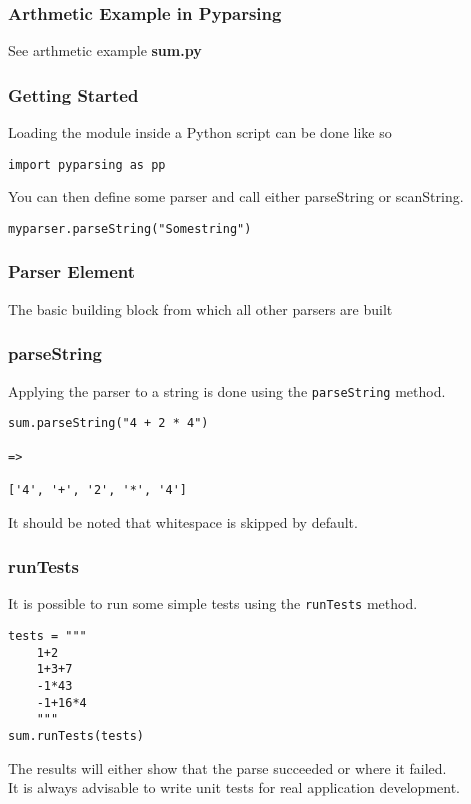 \documentclass{beamer}
\begin{document}
\begin{frame}
\frametitle{Arthmetic Example in Pyparsing}
See arthmetic example \textbf{sum.py}
\end{frame}


\begin{frame}[fragile]
\frametitle{Getting Started}
Loading the module inside a Python script can be done like so
\begin{verbatim}
import pyparsing as pp
\end{verbatim}
\bigskip
You can then define some parser and call either parseString or scanString.
\begin{verbatim}
myparser.parseString("Somestring")
\end{verbatim}
\end{frame}


\begin{frame}
\frametitle{Parser Element}
The basic building block from which all other parsers are built
\begin{center}
\end{center}
\end{frame}



\begin{frame}[fragile]
\frametitle{parseString}
Applying the parser to a string is done using the \texttt{parseString} method.

\begin{verbatim}
sum.parseString("4 + 2 * 4")

=>

['4', '+', '2', '*', '4']
\end{verbatim}
It should be noted that whitespace is skipped by default.
\end{frame}


\begin{frame}[fragile]
\frametitle{runTests}
It is possible to run some simple tests using the \texttt{runTests} method.

\begin{verbatim}
tests = """
    1+2
    1+3+7
    -1*43
    -1+16*4
    """
sum.runTests(tests)
\end{verbatim}
The results will either show that the parse succeeded or where it failed. \\
\medskip
It is always advisable to write unit tests for real application development.
\end{frame}
\end{document}
